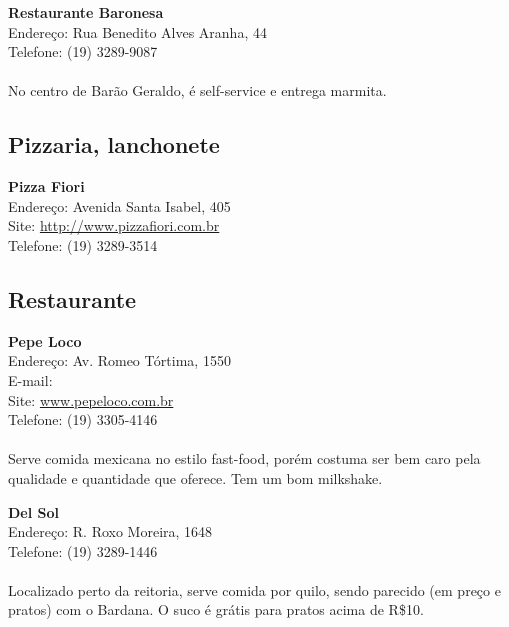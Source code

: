 \begin{itemsize}
\item \textbf{Restaurante Baronesa}
  \\Endereço: Rua Benedito Alves Aranha, 44
  \\Telefone: (19) 3289-9087
  \\
  \\No centro de Barão Geraldo, é self-service e entrega marmita.
\end{itemsize}

\subsection{Pizzaria, lanchonete}

\begin{itemsize}
\item \textbf{Pizza Fiori}
  \\Endereço: Avenida Santa Isabel, 405
  \\Site: \url{http://www.pizzafiori.com.br}
  \\Telefone: (19) 3289-3514
  \\
\end{itemsize}

\subsection{Restaurante}

\begin{itemsize}
\item \textbf{Pepe Loco}
  \\Endereço: Av. Romeo Tórtima, 1550
  \\E-mail: 
  \\Site: \url{www.pepeloco.com.br}
  \\Telefone: (19) 3305-4146
  \\
  \\Serve comida mexicana no estilo fast-food, porém costuma ser bem caro pela
  qualidade e quantidade que oferece. Tem um bom milkshake.
\end{itemsize}

\begin{itemsize}
\item \textbf{Del Sol}
  \\Endereço: R. Roxo Moreira, 1648
  \\Telefone: (19) 3289-1446
  \\
  \\Localizado perto da reitoria, serve comida por quilo, sendo parecido (em
  preço e pratos) com o Bardana. O suco é grátis para pratos acima de R\$10.
\end{itemsize}

